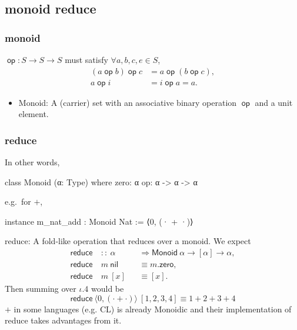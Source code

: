 \documentclass{beamer}
\DeclareMathOperator{\op}{\mathsf{op}}
\begin{document}
\subsection{monoid reduce}
\begin{frame}
    \frametitle{monoid}
    $\op: S\to S\to S$ must satisfy $\forall a,b,c,e\in S$,
    \begin{align*}
        (a \op b) \op c & = a \op (b \op c) \tag*{Associativity}, \\
        a \op i         & = i \op a = a \tag*{Identity}.
    \end{align*}
    \begin{itemize}
        \item \textsf{Monoid}: A (carrier) set with an associative binary operation $\op$ and a unit element.
    \end{itemize}

\end{frame}
\begin{frame}[fragile]
    \frametitle{reduce}
    In other words,

    \begin{leancode}
        class Monoid (α: Type) where
        zero: α
        op: α -> α -> α
    \end{leancode}

    e.g.\ for $+$,

    \begin{leancode}
        instance m_nat_add : Monoid Nat := ⟨0, (· + ·)⟩
    \end{leancode}

    \textsf{reduce}: A fold-like operation that reduces over a monoid. We expect
    \begin{align*}
        \mathsf{reduce} & \ ::\ \alpha      &  & \Rightarrow \textsf{Monoid}\ \alpha \to [\alpha] \to \alpha, \\
        \mathsf{reduce} & \ m\ \mathsf{nil} &  & \equiv m.\mathsf{zero},                                      \\
        \mathsf{reduce} & \ m\ [x]          &  & \equiv [x].
    \end{align*}
    Then summing over $\iota.4$ would be
    \begin{equation*}
        \mathsf{reduce}\ \langle 0,(\cdot + \cdot)\rangle\ [1,2,3,4] \equiv 1 + 2 + 3 + 4
    \end{equation*}
    $+$ in some languages (e.g. CL) is already Monoidic and their implementation of reduce takes advantages from it.
\end{frame}
\end{document}
